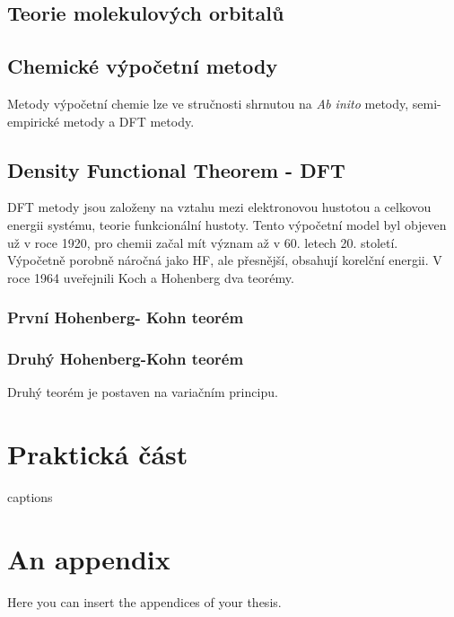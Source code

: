\documentclass[
  digital, %
  table,   %
  lof,     %
  lot,     %
]{fithesis3}
\begin{document}
\section{Teorie molekulových orbitalů}

\section{Chemické výpočetní metody}
Metody výpočetní chemie lze ve stručnosti shrnutou na \textit{Ab inito} metody, semi-empirické metody a DFT metody.

\section{Density Functional Theorem - DFT}
DFT metody jsou založeny na vztahu mezi elektronovou hustotou a celkovou energii systému, teorie funkcionální hustoty.  Tento výpočetní model byl objeven už v roce 1920, pro chemii začal mít význam až v 60. letech 20. století. Výpočetně porobně náročná jako HF, ale přesnější, obsahují korelční energii.\cite{lechamolecularmodeling}
V roce 1964 uveřejnili Koch a Hohenberg dva teorémy.
\subsection{První Hohenberg- Kohn teorém}

\subsection{Druhý Hohenberg-Kohn teorém}
Druhý teorém je postaven na variačním principu.
\cite{koch2000chemist} 

\chapter{Praktická část}


{\csname captions\languagename\endcsname %
\makeatletter %
  \thesis@selectLocale{\thesis@locale}\makeatother
\printbibliography[heading=bibintoc]} %
\appendix %
\chapter{An appendix}
Here you can insert the appendices of your thesis.
\end{document}
